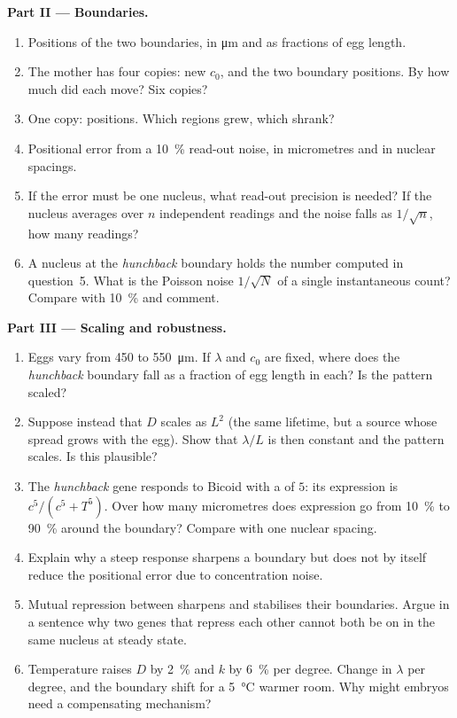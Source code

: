 \begin{problem}
\medskip
\noindent\textbf{Part II --- Boundaries.}
\begin{enumerate}[resume]
  \item Positions of the two boundaries, in \unit{\micro m} and as
        fractions of egg length.
  \item The mother has four copies: new $c_{0}$, and the two boundary
        positions. By how much did each move? Six copies?
  \item One copy: positions. Which regions grew, which shrank?
  \item Positional error from a \qty{10}{\%} read-out noise, in
        micrometres and in nuclear spacings.
  \item If the error must be one nucleus, what read-out precision is
        needed? If the nucleus averages over $n$ independent readings
        and the noise falls as $1/\sqrt{n}$, how many readings?
  \item A nucleus at the \emph{hunchback} boundary holds the number
        computed in question~5. What is the Poisson noise
        $1/\sqrt{N}$ of a single instantaneous count? Compare with
        \qty{10}{\%} and comment.
\end{enumerate}

\medskip
\noindent\textbf{Part III --- Scaling and robustness.}
\begin{enumerate}[resume]
  \item Eggs vary from \qty{450}{} to \qty{550}{\micro m}. If $\lambda$
        and $c_{0}$ are fixed, where does the \emph{hunchback} boundary
        fall as a fraction of egg length in each? Is the pattern scaled?
  \item Suppose instead that $D$ scales as $L^{2}$ (the same lifetime,
        but a source whose spread grows with the egg). Show that
        $\lambda/L$ is then constant and the pattern scales. Is this
        plausible?
  \item The \emph{hunchback} gene responds to Bicoid with a  of $5$: its expression is $c^{5}/(c^{5} + T^{5})$.
        Over how many micrometres does expression go from \qty{10}{\%}
        to \qty{90}{\%} around the boundary? Compare with one nuclear
        spacing.
  \item Explain why a steep response sharpens a boundary but does not
        by itself reduce the positional error due to concentration
        noise.
  \item Mutual repression between  sharpens and stabilises
        their boundaries. Argue in a sentence why two genes that repress
        each other cannot both be on in the same nucleus at steady
        state.
  \item Temperature raises $D$ by \qty{2}{\%} and $k$ by \qty{6}{\%} per
        degree. Change in $\lambda$ per degree, and the boundary shift
        for a \qty{5}{\celsius} warmer room. Why might embryos need a
        compensating mechanism?
\end{enumerate}


\end{problem}
